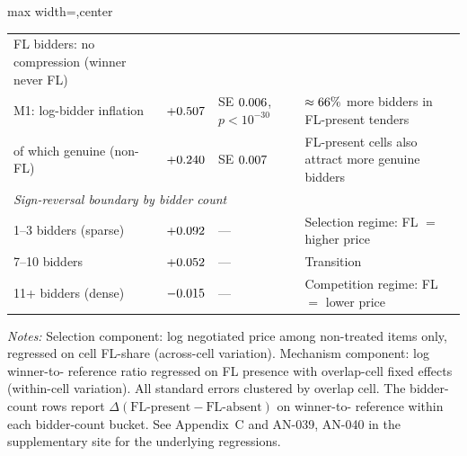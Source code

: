 \begin{table}[htbp]
\begin{adjustbox}{max width=\textwidth,center}
\begin{threeparttable}
\begin{tabular}{p{4.8cm}cp{2.0cm}p{5.6cm}}
  FL bidders: no compression (winner never FL) \\
\hspace{6pt} M1: log-bidder inflation & $+0.507$ &
  SE $0.006$, $p<10^{-30}$ &
  $\approx 66\%$ more bidders in FL-present tenders \\
\hspace{6pt} \hspace{6pt} of which genuine (non-FL) & $+0.240$ &
  SE $0.007$ &
  FL-present cells also attract more genuine bidders \\
\midrule
\multicolumn{4}{l}{\textit{Sign-reversal boundary by bidder count}} \\
\hspace{6pt} 1--3 bidders (sparse) & $+0.092$ & --- &
  Selection regime: FL $=$ higher price \\
\hspace{6pt} 7--10 bidders & $+0.052$ & --- &
  Transition \\
\hspace{6pt} 11+ bidders (dense) & $-0.015$ & --- &
  Competition regime: FL $=$ lower price \\
\bottomrule
\end{tabular}
\begin{tablenotes}
\footnotesize
\item \textit{Notes:} Selection component: log negotiated price
among non-treated items only, regressed on cell FL-share
(across-cell variation). Mechanism component: log winner-to-
reference ratio regressed on FL presence with overlap-cell fixed
effects (within-cell variation). All standard errors clustered
by overlap cell. The bidder-count rows report
$\Delta(\text{FL-present} - \text{FL-absent})$ on winner-to-
reference within each bidder-count bucket. See Appendix~C and
AN-039, AN-040 in the supplementary site for the underlying
regressions.
\end{tablenotes}
\end{threeparttable}
\end{adjustbox}
\end{table}

